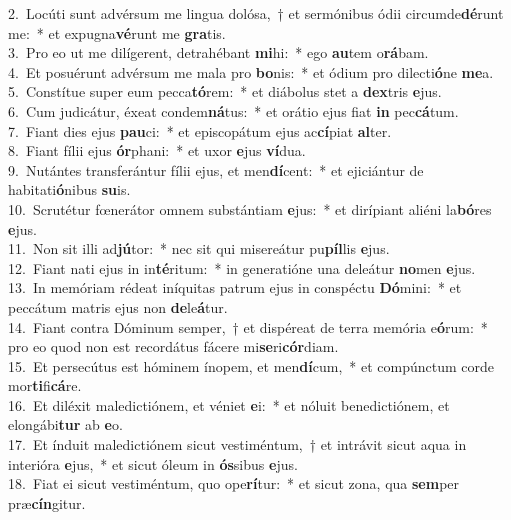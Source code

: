 {2.~}Locúti sunt advérsum me lingua dolósa,~† et sermónibus ódii circumde\textbf{dé}runt me:~* et expugna\textbf{vé}runt me \textbf{gra}tis.\\
{3.~}Pro eo ut me dilígerent, detrahébant \textbf{mi}hi:~* ego \textbf{au}tem o\textbf{rá}bam.\\
{4.~}Et posuérunt advérsum me mala pro \textbf{bo}nis:~* et ódium pro dilecti\textbf{ó}ne \textbf{me}a.\\
{5.~}Constítue super eum pecca\textbf{tó}rem:~* et diábolus stet a \textbf{dex}tris \textbf{e}jus.\\
{6.~}Cum judicátur, éxeat condem\textbf{ná}tus:~* et orátio ejus fiat \textbf{in} pec\textbf{cá}tum.\\
{7.~}Fiant dies ejus \textbf{pau}ci:~* et episcopátum ejus ac\textbf{cí}piat \textbf{al}ter.\\
{8.~}Fiant fílii ejus \textbf{ór}phani:~* et uxor \textbf{e}jus \textbf{ví}dua.\\
{9.~}Nutántes transferántur fílii ejus, et men\textbf{dí}cent:~* et ejiciántur de habitati\textbf{ó}nibus \textbf{su}is.\\
{10.~}Scrutétur fœnerátor omnem substántiam \textbf{e}jus:~* et dirípiant aliéni la\textbf{bó}res \textbf{e}jus.\\
{11.~}Non sit illi ad\textbf{jú}tor:~* nec sit qui misereátur pu\textbf{píl}lis \textbf{e}jus.\\
{12.~}Fiant nati ejus in in\textbf{té}ritum:~* in generatióne una deleátur \textbf{no}men \textbf{e}jus.\\
{13.~}In memóriam rédeat iníquitas patrum ejus in conspéctu \textbf{Dó}mini:~* et peccátum matris ejus non \textbf{de}le\textbf{á}tur.\\
{14.~}Fiant contra Dóminum semper,~† et dispéreat de terra memória e\textbf{ó}rum:~* pro eo quod non est recordátus fácere mi\textbf{se}ri\textbf{cór}diam.\\
{15.~}Et persecútus est hóminem ínopem, et men\textbf{dí}cum,~* et compúnctum corde mor\textbf{ti}fi\textbf{cá}re.\\
{16.~}Et diléxit maledictiónem, et véniet \textbf{e}i:~* et nóluit benedictiónem, et elongábi\textbf{tur} ab \textbf{e}o.\\
{17.~}Et índuit maledictiónem sicut vestiméntum,~† et intrávit sicut aqua in interióra \textbf{e}jus,~* et sicut óleum in \textbf{ós}sibus \textbf{e}jus.\\
{18.~}Fiat ei sicut vestiméntum, quo ope\textbf{rí}tur:~* et sicut zona, qua \textbf{sem}per præ\textbf{cín}gitur.\\
